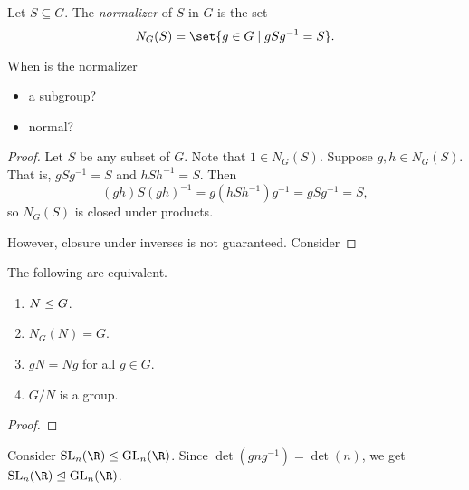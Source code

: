 \begin{definition}[normalizer] \label{def:normal:normalizer}
    Let $S \subseteq G$.
    The \emph{normalizer} of $S$ in $G$ is the set \[
        N_G(S) = \set{g \in G \mid gSg^{-1} = S}.
    \]
\end{definition}

\begin{exercise}[self]
    When is the normalizer
    \begin{itemize}
        \item a subgroup?
        \item normal?
    \end{itemize}
\end{exercise}
\begin{proof}
    Let $S$ be any subset of $G$.
    Note that $1 \in N_G(S)$.
    Suppose $g, h \in N_G(S)$.
    That is, $gSg^{-1} = S$ and $hSh^{-1} = S$.
    Then \[
        (gh)S(gh)^{-1} = g(hSh^{-1})g^{-1} = gSg^{-1} = S,
    \] so $N_G(S)$ is closed under products.

    However, closure under inverses is not guaranteed.
    Consider
\end{proof}

\begin{exercise} \label{thm:normal:prop}
    The following are equivalent.
    \begin{enumerate}
        \item \label{thm:normal:prop:normal}
            $N \trianglelefteq G$.
        \item \label{thm:normal:prop:normalizer}
            $N_G(N) = G$.
        \item \label{thm:normal:prop:conjugate}
            $gN = Ng$ for all $g \in G$.
        \item \label{thm:normal:prop:quotient}
            $G/N$ is a group.
    \end{enumerate}
\end{exercise}
\begin{proof}
    
\end{proof}

\begin{examples}
    \item Consider $\SL_n(\R) \le \GL_n(\R)$.
    Since $\det(gng^{-1}) = \det(n)$, we get $\SL_n(\R) \nsub \GL_n(\R)$.
\end{examples}

